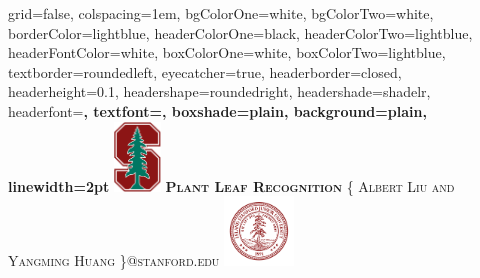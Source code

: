 \documentclass[landscape,a0paper,fontscale=0.285]{baposter}
\begin{document}
\begin{poster}%
  {
  grid=false,
  colspacing=1em,
  bgColorOne=white,
  bgColorTwo=white,
  borderColor=lightblue,
  headerColorOne=black,
  headerColorTwo=lightblue,
  headerFontColor=white,
  boxColorOne=white,
  boxColorTwo=lightblue,
  textborder=roundedleft,
  eyecatcher=true,
  headerborder=closed,
  headerheight=0.1\textheight,
  headershape=roundedright,
  headershade=shadelr,
  headerfont=\Large\bf\textsc, %
  textfont={\setlength{\parindent}{1.5em}},
  boxshade=plain,
  background=plain,
  linewidth=2pt
  }
  {\includegraphics[height=5em]{SU_New_BlockStree_2color}}
  {\bf\textsc{Plant Leaf Recognition}\vspace{0.5em}}
  {\textsc{\{ Albert Liu and Yangming Huang \}@stanford.edu}}
  {%
    \includegraphics[height=5.0em]{SU_Seal_Red}
  }

    \newcommand{\colouredcircle}{%
      \tikz{\useasboundingbox (-0.2em,-0.32em) rectangle(0.2em,0.32em);
            \draw[draw=black,fill=lightblue,line width=0.03em] (0,0) circle(0.18em);
      }
    }


\end{poster}
\end{document}
